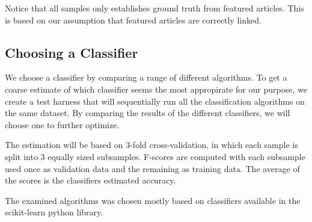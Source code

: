Notice that all samples only establishes ground truth from featured articles. This is based on our assumption that featured articles are correctly linked.

\subsection{Choosing a Classifier}\label{choosing_classifier}
We choose a classifier by comparing a range of different algorithms. To get a coarse estimate of which classifier seems the most appropirate for our purpose, we create a test harness that will sequentially run all the classification algorithms on the same dataset. By comparing the results of the different classifiers, we will choose one to further optimize.

The estimation will be based on 3-fold cross-validation, in which each sample is split into 3 equally sized subsamples. F-scores are computed with each subsample used once as validation data and the remaining as training data. The average of the scores is the classifiers estimated accuracy.

The examined algorithms was chosen mostly based on classifiers available in the scikit-learn python library. 




